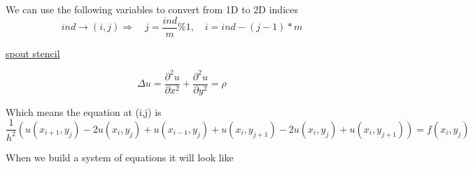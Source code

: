 \documentclass[10pt]{article}
\newcommand{\1}{\mathbb{1}}
\renewcommand{\part}{\partial}
\begin{document}
We can use the following variables to convert from 1D to 2D indices
\[ind \to (i,j) \Rightarrow \quad j = \frac{ind}{m} \% 1, \quad i = ind - (j-1)*m\]

\underline{spout stencil}

\[\Delta u = \frac{\part^2 u}{\part x^2} + \frac{\part^2 u}{\part y^2} = \rho \]

Which means the equation at (i,j) is 
\[\frac{1}{h^2} (u(x_{i+1}, y_j) -2u(x_{i}, y_j) + u(x_{i-1}, y_j) + u(x_{i}, y_{j+1}) - 2u(x_{i}, y_j) + u(x_{i}, y_{j+1})) = f(x_i,y_j)\]

When we build a system of equations it will look like
\end{document}
